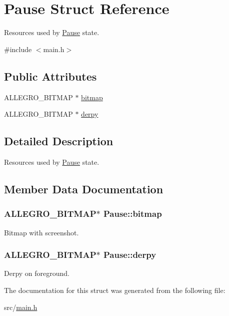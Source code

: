 \hypertarget{structPause}{\section{Pause Struct Reference}
\label{structPause}
}


Resources used by \hyperlink{structPause}{Pause} state.  




{\ttfamily \#include $<$main.\-h$>$}

\subsection*{Public Attributes}
\begin{DoxyCompactItemize}
\item 
A\-L\-L\-E\-G\-R\-O\-\_\-\-B\-I\-T\-M\-A\-P $\ast$ \hyperlink{structPause_a50c6c3e5d72008c50ae7e3aba1c794d1}{bitmap}
\item 
A\-L\-L\-E\-G\-R\-O\-\_\-\-B\-I\-T\-M\-A\-P $\ast$ \hyperlink{structPause_aa2a1cde9971149a5c48f10899ca97079}{derpy}
\end{DoxyCompactItemize}


\subsection{Detailed Description}
Resources used by \hyperlink{structPause}{Pause} state. 

\subsection{Member Data Documentation}
\hypertarget{structPause_a50c6c3e5d72008c50ae7e3aba1c794d1}{
\subsubsection[{bitmap}]{\setlength{\rightskip}{0pt plus 5cm}A\-L\-L\-E\-G\-R\-O\-\_\-\-B\-I\-T\-M\-A\-P$\ast$ Pause\-::bitmap}}\label{structPause_a50c6c3e5d72008c50ae7e3aba1c794d1}
Bitmap with screenshot. \hypertarget{structPause_aa2a1cde9971149a5c48f10899ca97079}{
\subsubsection[{derpy}]{\setlength{\rightskip}{0pt plus 5cm}A\-L\-L\-E\-G\-R\-O\-\_\-\-B\-I\-T\-M\-A\-P$\ast$ Pause\-::derpy}}\label{structPause_aa2a1cde9971149a5c48f10899ca97079}
Derpy on foreground. 

The documentation for this struct was generated from the following file\-:\begin{DoxyCompactItemize}
\item 
src/\hyperlink{main_8h}{main.\-h}\end{DoxyCompactItemize}
